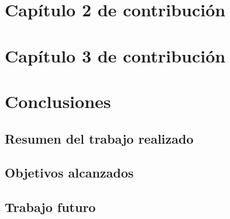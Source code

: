 \documentclass[11pt,spanish,listoffigures,listoftables]{tfgetsinf}
\begin{document}
\chapter{Capítulo 2 de contribución}   %


\chapter{Capítulo 3 de contribución}   %


\chapter{Conclusiones}  %

\section{Resumen del trabajo realizado} %

\section{Objetivos alcanzados}         %

\section{Trabajo futuro}               %

\end{document}
